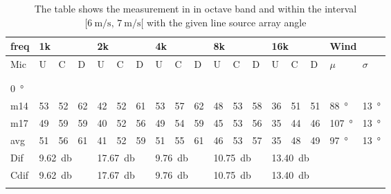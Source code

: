 \begin{table}[H]
\centering
\caption{The table shows the measurement in in octave band and within the interval $[\SI{6}{\meter\per\second},\, \SI{7}{\meter\per\second}[ $ with the given line source array angle}
\setlength\tabcolsep{5pt} %
\begin{tabular}{l|l|l|l|l|l|l|l|l|l|l|l|l|l|l|l|l|l}
freq & \multicolumn{3}{l|}{1k} & \multicolumn{3}{l|}{2k} & \multicolumn{3}{l|}{4k} & \multicolumn{3}{l|}{8k} & \multicolumn{3}{l|}{16k}   &  \multicolumn{2}{l}{Wind}                      \\ \hline
Mic  & U      & C      & D     & U      & C      & D     & U      & C      & D     & U      & C      & D     & U  & C  & D & $\mu$ & $\sigma$ \\ \hline
 & \multicolumn{3}{l|}{} & \multicolumn{3}{l|}{} & \multicolumn{3}{l|}{} & \multicolumn{3}{l|}{} & \multicolumn{3}{l|}{} &      \multicolumn{2}{l}{}                        \\ 
 \multicolumn{18}{l}{ } \\   
\SI{0}{\degree}   & \multicolumn{3}{l|}{} & \multicolumn{3}{l|}{} & \multicolumn{3}{l|}{} & \multicolumn{3}{l|}{} &  \multicolumn{3}{l|}{} &   \multicolumn{2}{l}{}   \\  \hline
m14  & 53     & 52     & 62    & 42     & 52     & 61    & 53     & 57     & 62    & 48     & 53     & 58    & 36 & 51 & 51 & \SI{88}{\degree} & \SI{13}{\degree}   \\
m17  & 49     & 59     & 59    & 40     & 52     & 56    & 49     & 54     & 59    & 45     & 53     & 56    & 35 & 44 & 46 &\SI{107}{\degree} & \SI{13}{\degree}  \\ \hline
avg  &   51    &   56   & 61    &  41    &  52    &  59  &   51     &  55   &   61  &  46    & 53    &  57     & 35   & 48   & 49 & \SI{97}{\degree} & \SI{13}{\degree} \\ \hline  
Dif & \multicolumn{3}{l|}{\SI{9.62}{\decibel}} & \multicolumn{3}{l|}{\SI{17.67}{\decibel}} & \multicolumn{3}{l|}{\SI{9.76}{\decibel}} & \multicolumn{3}{l|}{\SI{10.75}{\decibel}} &  \multicolumn{3}{l|}{\SI{13.40}{\decibel}} &  \multicolumn{2}{l}{}  \\ \hline 
Cdif & \multicolumn{3}{l|}{\SI{9.62}{\decibel}} & \multicolumn{3}{l|}{\SI{17.67}{\decibel}} & \multicolumn{3}{l|}{\SI{9.76}{\decibel}} & \multicolumn{3}{l|}{\SI{10.75}{\decibel}} & \multicolumn{3}{l|}{\SI{13.40}{\decibel}}  &   \multicolumn{2}{l}{}   \\ 
 \multicolumn{18}{l}{ } \\                             

\end{tabular}
\end{table}
